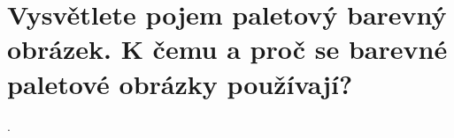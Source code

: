 \section{Vysvětlete pojem paletový barevný obrázek. K čemu a proč se barevné paletové obrázky používají?}.
